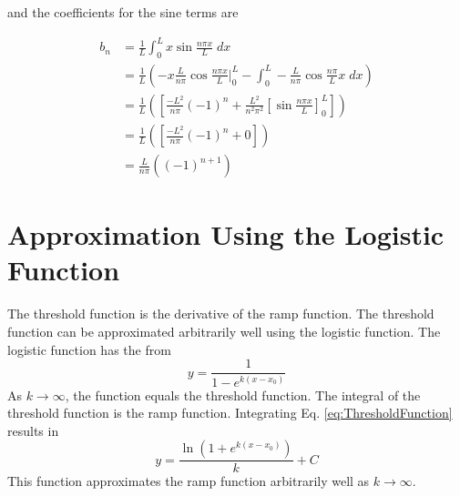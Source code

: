 and the coefficients for the sine terms are 


\begin{equation}
 \begin{split} 
     b_n &= \frac{1}{L} \int_{0}^{L} x \sin{\frac{n \pi x}{L}} \; dx \\ 
         &=  \frac{1}{L} \left(-x \frac{L}{n \pi}   \cos{\frac{n \pi x}{L}}  \bigg|^{L}_0  - \int_0^L -\frac{L}{n \pi}\cos{\frac{n \pi}{L} x} \; dx  \right) \\
         &= \frac{1}{L} \left( \left[ \frac{-L^2}{n \pi} (-1)^n  +\frac{L^2}{n^2 \pi^2}   \left[ \sin{\frac{n \pi x}{L}} \right]_0^L  \right] \right) \\
         &= \frac{1}{L} \left( \left[ \frac{-L^2}{n \pi} (-1)^n  + 0 \right] \right) \\
         &= \frac{L}{n \pi}\left( (-1)^{n+1} \right)
 \end{split}
\end{equation}

\section{Approximation Using the Logistic Function}

The threshold function is the derivative of the ramp function. The
threshold function can be approximated arbitrarily well using the
logistic function. The logistic function has the from
\begin{equation}\label{eq:ThresholdFunction}
    y=\frac{1}{1-e^{k\left(x-x_{0}\right)}}  
\end{equation}
As \(k\to\infty\), the function equals the threshold function. The
integral of the threshold function is the ramp function. Integrating 
Eq. \ref{eq:ThresholdFunction} results in 
\begin{equation}
    y=\frac{\ln \left(1+e^{k\left(x-x_{0}\right)}\right) }{k} + C
\end{equation}
This function approximates the ramp function arbitrarily well as
\(k\to\infty\). 




